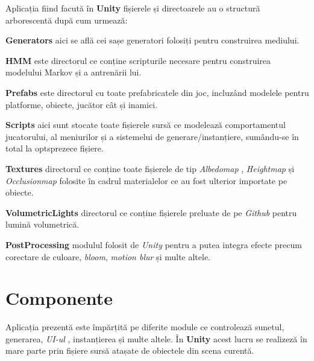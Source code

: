 Aplicația fiind facută în \textbf{Unity} fișierele și directoarele au o structură arborescentă după cum urmează: \par

\par

\textbf{Generators} aici se află cei sașe generatori folosiți pentru construirea mediului.\par

\textbf{HMM} este directorul ce conține scripturile necesare pentru construirea modelului Markov și a antrenării lui.\par

\textbf{Prefabs} este directorul cu toate prefabricatele din joc, incluzând modelele pentru platforme, obiecte, jucător cât și inamici.

\textbf{Scripts} aici sunt stocate toate fișierele sursă ce modelează comportamentul jucatorului, al meniurilor și a sistemelui de generare/instanțiere, sumându-se în total la optsprezece fișiere.\par

\textbf{Textures} directorul ce conține toate fișierele de tip \textit{Albedomap} , \textit{Heightmap} și \textit{Occlusionmap} folosite în cadrul materialelor ce au fost ulterior importate pe obiecte.\par

\textbf{VolumetricLights} directorul ce conține fișierele preluate de pe \textit{Github} pentru lumină volumetrică.\par

\textbf{PostProcessing} modulul folosit de \textit{Unity} pentru a putea integra efecte precum corectare de culoare, \textit{bloom}, \textit{motion blur} și multe altele.\par


\section{Componente}
Aplicația prezentă este împărțită pe diferite module ce controlează sunetul, generarea, \textit{UI-ul} , instanțierea și multe altele. În \textbf{Unity} acest lucru se realizeză în mare parte prin fișiere sursă atașate de obiectele din scena curentă. \par

